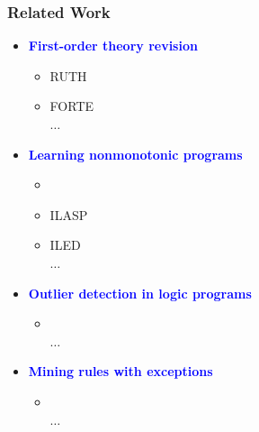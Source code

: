 \documentclass{beamer}
\newcommand{\bl}[1]{\textcolor{blue}{#1}}
\newcommand{\gr}[1]{\textcolor{darkgreen}{#1}}
\def\cG{\ensuremath{\mathcal{G}}}
\def\cR{\ensuremath{\mathcal{R}}}
\newcommand{\mi}[1]{\ensuremath{\mathit{#1}}}
\begin{document}
\begin{frame}\frametitle{Related Work}
\begin{itemize}
\item \textbf{\bl{First-order theory revision}}
\begin{itemize}
\item RUTH \cite{ref2}
\item FORTE \cite{ref}\\
$\dotsc$
\end{itemize}
\medskip

\item \textbf{\bl{Learning nonmonotonic programs}}
\begin{itemize}
\item \cite{kakas}
\item ILASP \cite{ilasp}
\item ILED \cite{iled}\\
$\dotsc$
\end{itemize}
\medskip


\item \textbf{\bl{Outlier detection in logic programs}} 
\begin{itemize}
\item \cite{DBLP:journals/datamine/AngiulliF14}\\
$\dotsc$
\end{itemize}
\medskip

\item \textbf{\bl{Mining rules with exceptions}} 
\begin{itemize}
\item \cite{suzuki}\\
$\dotsc$
\end{itemize}
\end{itemize}
\end{frame}


\end{document}
